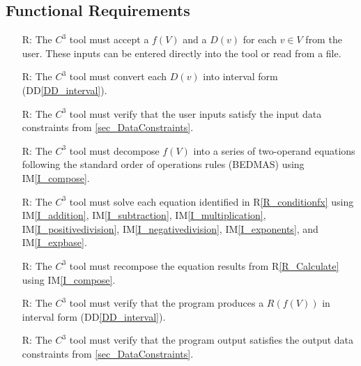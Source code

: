 \documentclass[12pt]{article}
\newcommand{\ddref}[1]{DD\ref{#1}}
\newcommand{\iref}[1]{IM\ref{#1}}
\newcounter{reqnum} %
\newcommand{\rref}[1]{R\ref{#1}}
\newcommand{\prognameAbbrv}{$C^{3}$}
\begin{document}
\subsection{Functional Requirements}

\noindent \begin{itemize}

\item[R\refstepcounter{reqnum}\thereqnum \label{R_Inputs}:] The 
\prognameAbbrv{} tool must accept a $f(V)$ and a $D(v)$ for each $v \in V$ from 
the user. These inputs can be entered directly into the tool or read from a 
file.

\item[R\refstepcounter{reqnum}\thereqnum \label{R_conditionX}:] The 
\prognameAbbrv{} tool must convert each $D(v)$ into interval form 
(\ddref{DD_interval}).

\item[R\refstepcounter{reqnum}\thereqnum \label{R_verifyinputs}:] The 
\prognameAbbrv{} tool must verify that the user inputs satisfy the input data 
constraints from \ref{sec_DataConstraints}.

\item[R\refstepcounter{reqnum}\thereqnum \label{R_conditionfx}:] The 
\prognameAbbrv{} tool must decompose $f(V)$ into a series of two-operand 
equations following the standard order of operations rules (BEDMAS) using 
\iref{I_compose}.

\item[R\refstepcounter{reqnum}\thereqnum \label{R_Calculate}:] The 
\prognameAbbrv{} tool must solve each equation identified in 
\rref{R_conditionfx} using \iref{I_addition}, \iref{I_subtraction}, 
\iref{I_multiplication}, \iref{I_positivedivision}, \iref{I_negativedivision}, 
\iref{I_exponents}, and \iref{I_expbase}.

\item[R\refstepcounter{reqnum}\thereqnum \label{R_CalculateCompose}:] The 
\prognameAbbrv{} tool must recompose the equation results from 
\rref{R_Calculate} using \iref{I_compose}.

\item[R\refstepcounter{reqnum}\thereqnum \label{R_VerifyOutput}:] The 
\prognameAbbrv{} tool must verify that the program produces a $R(f(V))$ in 
interval form (\ddref{DD_interval}).

\item[R\refstepcounter{reqnum}\thereqnum \label{R_VerifyOutputConstraints}:] 
The \prognameAbbrv{} tool must verify that the program output satisfies the 
output data constraints from \ref{sec_DataConstraints}.


\end{itemize}
\end{document}

